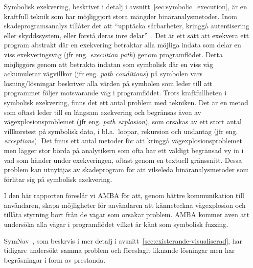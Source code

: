 Symbolisk exekvering, beskrivet i detalj i avsnitt~\ref{sec:symbolic_execution},
är en kraftfull teknik som har möjliggjort stora mängder
binäranalysmetoder\cite{survey_symb_exc, symnav}. Inom skadeprogramsanalys
tillåter det att ``upptäcka sårbarheter, kringgå autentisering eller
skyddssystem, eller förstå deras inre delar''~\cite{symnav}. Det är ett sätt
att exekvera ett program abstrakt där en exekvering betraktar alla möjliga
indata som delar en viss exekveringsväg (jfr eng. \emph{execution path}) genom
programflödet. Detta möjliggörs genom att betrakta indatan som symbolisk där en
viss väg ackumulerar vägvillkor (jfr eng. \emph{path conditions}) på symbolen
vars lösning/lösningar beskriver alla värden på symbolen som leder till att
programmet följer motsvarande väg i programflödet. Trots kraftfullheten i
symbolisk exekvering, finns det ett antal problem med tekniken. Det är en metod
som oftast leder till en långsam exekvering och begränsas även av
vägexplosionsproblemet (jfr eng. \emph{path explosion}), som orsakas av ett
stort antal villkorstest på symbolisk data, i bl.a.\ loopar, rekursion och
undantag (jfr eng. \emph{exceptions}). Det finns ett antal metoder för att
kringgå vägexplosionsproblemet men lägger stor börda på analytikern som ofta
har ett väldigt begränsad vy in i vad som händer under exekveringen, oftast
genom en textuell gränssnitt. Dessa problem kan utnyttjas av skadeprogram för
att vilseleda binäranalysmetoder som förlitar sig på symbolisk exekvering.

I den här rapporten föreslår vi AMBA för att, genom bättre kommunikation till
användaren, skapa möjligheter för användaren att känneteckna vägexplosion och
tillåta styrning bort från de vägar som orsakar problem. AMBA kommer även
att undersöka alla vägar i programflödet vilket är känt som symbolisk fuzzing.

SymNav~\cite{symnav}, som beskrvis i mer detalj i
avsnitt~\ref{sec:existerande-visualiserad}, har tidigare undersökt samma problem och
föreslagit liknande lösningar men har begräsningar i form av prestanda.



%
